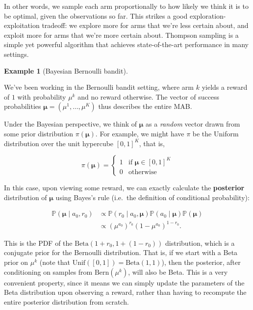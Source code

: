 \documentclass[
  letterpaper,
  DIV=11,
  numbers=noendperiod]{scrreprt}
\theoremstyle{plain}
\theoremstyle{plain}
\theoremstyle{definition}
\newtheorem{example}{Example}[chapter]
\theoremstyle{definition}
\theoremstyle{remark}
\begin{document}
In other words, we sample each arm proportionally to how likely we think
it is to be optimal, given the observations so far. This strikes a good
exploration-exploitation tradeoff: we explore more for arms that we're
less certain about, and exploit more for arms that we're more certain
about. Thompson sampling is a simple yet powerful algorithm that
achieves state-of-the-art performance in many settings.

\begin{example}[Bayesian Bernoulli
bandit]\protect\hypertarget{exm-bayesian_bernoulli}{}\label{exm-bayesian_bernoulli}

We've been working in the Bernoulli bandit setting, where arm \(k\)
yields a reward of \(1\) with probability \(\mu^k\) and no reward
otherwise. The vector of success probabilities
\(\boldsymbol{\mu} = (\mu^1, \dots, \mu^K)\) thus describes the entire
MAB.

Under the Bayesian perspective, we think of \(\boldsymbol{\mu}\) as a
\emph{random} vector drawn from some prior distribution
\(\pi(\boldsymbol{\mu})\). For example, we might have \(\pi\) be the
Uniform distribution over the unit hypercube \([0, 1]^K\), that is,

\[\pi(\boldsymbol{\mu}) = \begin{cases}
    1 & \text{if } \boldsymbol{\mu}\in [0, 1]^K \\
    0 & \text{otherwise}
\end{cases}\]

In this case, upon viewing some reward, we can exactly calculate the
\textbf{posterior} distribution of \(\boldsymbol{\mu}\) using Bayes's
rule (i.e.~the definition of conditional probability):

\[
\begin{aligned}
    \mathbb{P}(\boldsymbol{\mu} \mid a_0, r_0) &\propto \mathbb{P}(r_0 \mid a_0, \boldsymbol{\mu}) \mathbb{P}(a_0 \mid \boldsymbol{\mu}) \mathbb{P}(\boldsymbol{\mu}) \\
    &\propto (\mu^{a_0})^{r_0} (1 - \mu^{a_0})^{1-r_0}.
\end{aligned}
\]

This is the PDF of the \(\text{Beta}(1 + r_0, 1 + (1 - r_0))\)
distribution, which is a conjugate prior for the Bernoulli distribution.
That is, if we start with a Beta prior on \(\mu^k\) (note that
\(\text{Unif}([0, 1]) = \text{Beta}(1, 1)\)), then the posterior, after
conditioning on samples from \(\text{Bern}(\mu^k)\), will also be Beta.
This is a very convenient property, since it means we can simply update
the parameters of the Beta distribution upon observing a reward, rather
than having to recompute the entire posterior distribution from scratch.

\end{example}
\end{document}
